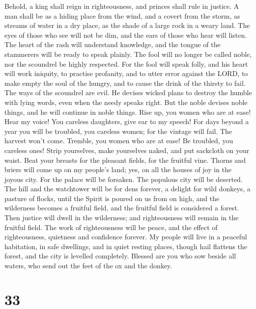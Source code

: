  Behold, a king shall reign in righteousness, and princes
shall rule in justice.  A man shall be as a hiding place
from the wind, and a covert from the storm, as streams of water in a dry
place, as the shade of a large rock in a weary land.  The
eyes of those who see will not be dim, and the ears of those who hear
will listen.  The heart of the rash will understand
knowledge, and the tongue of the stammerers will be ready to speak
plainly.  The fool will no longer be called noble, nor the
scoundrel be highly respected.  For the fool will speak
folly, and his heart will work iniquity, to practise profanity, and to
utter error against the LORD, to make empty the soul of the hungry, and
to cause the drink of the thirsty to fail.  The ways of
the scoundrel are evil. He devises wicked plans to destroy the humble
with lying words, even when the needy speaks right.  But
the noble devises noble things, and he will continue in noble things.
 Rise up, you women who are at ease! Hear my voice! You
careless daughters, give ear to my speech!  For days
beyond a year you will be troubled, you careless women; for the vintage
will fail. The harvest won't come.  Tremble, you women
who are at ease! Be troubled, you careless ones! Strip yourselves, make
yourselves naked, and put sackcloth on your waist.  Beat
your breasts for the pleasant fields, for the fruitful vine.
 Thorns and briers will come up on my people's land; yes,
on all the houses of joy in the joyous city.  For the
palace will be forsaken. The populous city will be deserted. The hill
and the watchtower will be for dens forever, a delight for wild donkeys,
a pasture of flocks,  until the Spirit is poured on us
from on high, and the wilderness becomes a fruitful field, and the
fruitful field is considered a forest.  Then justice will
dwell in the wilderness; and righteousness will remain in the fruitful
field.  The work of righteousness will be peace, and the
effect of righteousness, quietness and confidence forever.
 My people will live in a peaceful habitation, in safe
dwellings, and in quiet resting places,  though hail
flattens the forest, and the city is levelled completely.
 Blessed are you who sow beside all waters, who send out
the feet of the ox and the donkey.

\hypertarget{section-32}{%
\section{33}\label{section-32}}


